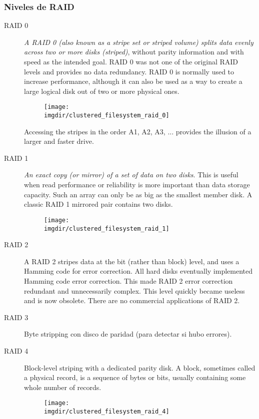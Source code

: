 \documentclass[a4paper, twoside]{article}
\newcommand{\imgdir}{../resources/images} %
\begin{document}
\subsubsection{Niveles de RAID}
\begin{description}
	\item[RAID 0] \emph{A RAID 0 (also known as a stripe set or striped volume) splits data evenly across two or more disks (striped)}, without parity information and with speed as the intended goal. RAID 0 was not one of the original RAID levels and provides no data redundancy. RAID 0 is normally used to increase performance, although it can also be used as a way to create a large logical disk out of two or more physical ones.
	\begin{figure}[h]
		\centering
		\texttt{[image: \\imgdir/clustered\_filesystem\_raid\_0]}
		\label{fig:clustered_filesystem_raid_0}
	\end{figure}
	Accessing the stripes in the order A1, A2, A3, ... provides the illusion of a larger and faster drive.

	\item[RAID 1] \emph{An exact copy (or mirror) of a set of data on two disks}. This is useful when read performance or reliability is more important than data storage capacity. Such an array can only be as big as the smallest member disk. A classic RAID 1 mirrored pair contains two disks.
	\begin{figure}[h]
		\centering
		\texttt{[image: \\imgdir/clustered\_filesystem\_raid\_1]}
		\label{fig:clustered_filesystem_raid_1}
	\end{figure}

	\item[RAID 2] A RAID 2 stripes data at the bit (rather than block) level, and uses a Hamming code for error correction. All hard disks eventually implemented Hamming code error correction. This made RAID 2 error correction redundant and unnecessarily complex. This level quickly became useless and is now obsolete. There are no commercial applications of RAID 2.

	\item[RAID 3] Byte stripping con disco de paridad (para detectar si hubo errores).

	\item[RAID 4] Block-level striping with a dedicated parity disk. A block, sometimes called a physical record, is a sequence of bytes or bits, usually containing some whole number of records.
	\begin{figure}[h]
		\centering
		\texttt{[image: \\imgdir/clustered\_filesystem\_raid\_4]}
		\label{fig:clustered_filesystem_raid_4}
	\end{figure}


\end{description}
\end{document}
